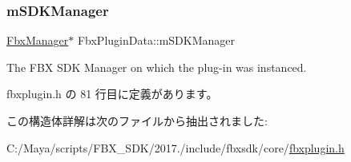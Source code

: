 \subsubsection{\texorpdfstring{m\+S\+D\+K\+Manager}{mSDKManager}}
{\footnotesize\ttfamily \hyperlink{class_fbx_manager}{Fbx\+Manager}$\ast$ Fbx\+Plugin\+Data\+::m\+S\+D\+K\+Manager}



The F\+BX S\+DK Manager on which the plug-\/in was instanced. 



 fbxplugin.\+h の 81 行目に定義があります。



この構造体詳解は次のファイルから抽出されました\+:\begin{DoxyCompactItemize}
\item 
C\+:/\+Maya/scripts/\+F\+B\+X\+\_\+\+S\+D\+K/2017./include/fbxsdk/core/\hyperlink{fbxplugin_8h}{fbxplugin.\+h}\end{DoxyCompactItemize}
